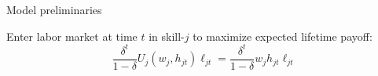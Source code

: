 \begin{frame}{Model preliminaries}
    



\vspace{2ex}
Enter labor market at time $t$ in skill-$j$ to maximize expected lifetime payoff:
\begin{equation*}
    \frac{\delta^t}{1 - \delta} U_j (w_{j}, h_{jt}) \ell_{jt}
    = \frac{\delta^t}{1 - \delta} w_{j} h_{jt} \ell_{jt}
\end{equation*}


\end{frame}

